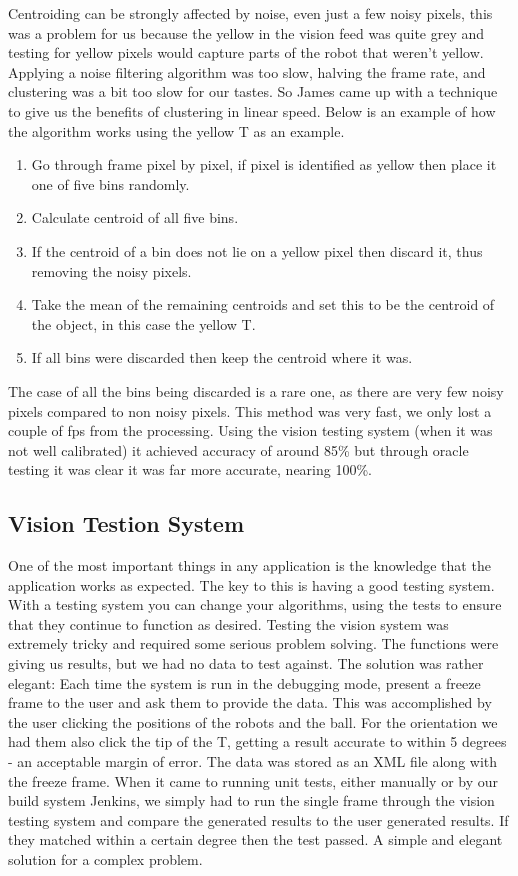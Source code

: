 Centroiding can be strongly affected by noise, even just a few noisy pixels, this was a problem for us because the yellow in the vision feed was quite grey and testing for yellow pixels would capture parts of the robot that weren't yellow.  Applying a noise filtering algorithm was too slow, halving the frame rate, and clustering was a bit too slow for our tastes.  So James came up with a technique to give us the benefits of clustering in linear speed.  Below is an example of how the algorithm works using the yellow T as an example.
\begin{enumerate}
\item Go through frame pixel by pixel, if pixel is identified as yellow then place it one of five bins randomly.
\item Calculate centroid of all five bins.
\item If the centroid of a bin does not lie on a yellow pixel then discard it, thus removing the noisy pixels.
\item Take the mean of the remaining centroids and set this to be the centroid of the object, in this case the yellow T.
\item If all bins were discarded then keep the centroid where it was.
\end{enumerate}

The case of all the bins being discarded is a rare one, as there are very few noisy pixels compared to non noisy pixels.  This method was very fast, we only lost a couple of fps from the processing.  Using the vision testing system (when it was not well calibrated) it achieved accuracy of around 85\% but through oracle testing it was clear it was far more accurate, nearing 100\%.

\subsection{Vision Testion System}

One of the most important things in any application is the knowledge that the application works as expected. The key to this is having a good testing system. With a testing system you can change your algorithms, using the tests to ensure that they continue to function as desired. Testing the vision system was extremely tricky and required some serious problem solving. The functions were giving us results, but we had no data to test against. The solution was rather elegant: Each time the system is run in the debugging mode, present a freeze frame to the user and ask them to provide the data. This was accomplished by the user clicking the positions of the robots and the ball. For the orientation we had them also click the tip of the T, getting a result accurate to within 5 degrees - an acceptable margin of error. The data was stored as an XML file along with the freeze frame. When it came to running unit tests, either manually or by our build system Jenkins, we simply had to run the single frame through the vision testing system and compare the generated results to the user generated results. If they matched within a certain degree then the test passed. A simple and elegant solution for a complex problem. 

